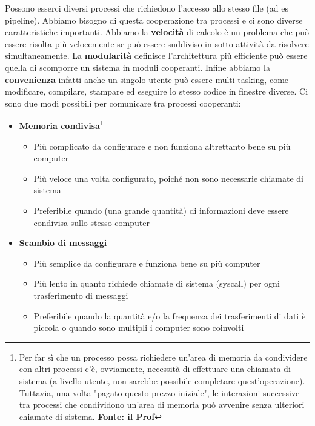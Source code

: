 \documentclass{article}
\begin{document}
Possono esserci diversi processi che richiedono l'accesso allo stesso file (ad es pipeline). Abbiamo bisogno di questa cooperazione tra processi e ci sono diverse caratteristiche importanti. Abbiamo la \textbf{velocità} di calcolo è un problema che può essere risolta più velocemente se può essere suddiviso in sotto-attività da risolvere simultaneamente. La \textbf{modularità} definisce l'architettura più efficiente può essere quella di scomporre un sistema in moduli cooperanti. Infine abbiamo la \textbf{convenienza} infatti anche un singolo utente può essere multi-tasking, come modificare, compilare, stampare ed eseguire lo stesso codice in finestre diverse.
Ci sono due modi possibili per comunicare tra processi cooperanti:
\begin{itemize}
    \item \textbf{Memoria condivisa}\footnote{Per far sì che un processo possa richiedere un'area di memoria da condividere con altri processi c'è, ovviamente, necessità di effettuare una chiamata di sistema (a livello utente, non sarebbe possibile completare quest'operazione). Tuttavia, una volta "pagato questo prezzo iniziale", le interazioni successive tra processi che condividono un'area di memoria può avvenire senza ulteriori chiamate di sistema. \textbf{Fonte: il Prof}}
    \begin{itemize}
        \item Più complicato da configurare e non funziona altrettanto bene su più computer
        \item Più veloce una volta configurato, poiché non sono necessarie chiamate di sistema
        \item Preferibile quando (una grande quantità) di informazioni deve essere condivisa sullo stesso computer
    \end{itemize}
    \item \textbf{Scambio di messaggi} 
    \begin{itemize}
        \item Più semplice da configurare e funziona bene su più computer
        \item Più lento in quanto richiede chiamate di sistema (syscall) per ogni trasferimento di messaggi
        \item Preferibile quando la quantità e/o la frequenza dei trasferimenti di dati è piccola o quando sono multipli i computer sono coinvolti
    \end{itemize}
\end{itemize}
\end{document}
